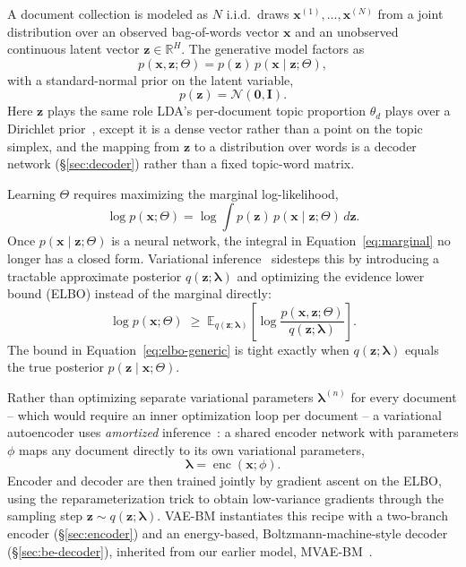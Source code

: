 \documentclass[11pt]{article}
\begin{document}
A document collection is modeled as $N$ i.i.d.\ draws $\mathbf{x}^{(1)},\dots,\mathbf{x}^{(N)}$ from a joint distribution over an observed bag-of-words vector $\mathbf{x}$ and an unobserved continuous latent vector $\mathbf{z}\in\mathbb{R}^H$. The generative model factors as
\begin{equation}
p(\mathbf{x},\mathbf{z};\Theta) = p(\mathbf{z})\,p(\mathbf{x}\mid\mathbf{z};\Theta),
\label{eq:joint}
\end{equation}
with a standard-normal prior on the latent variable,
\begin{equation}
p(\mathbf{z}) = \mathcal{N}(\mathbf{0},\mathbf{I}).
\label{eq:prior}
\end{equation}
Here $\mathbf{z}$ plays the same role LDA's per-document topic proportion $\theta_d$ plays over a Dirichlet prior~\citep{blei2003lda}, except it is a dense vector rather than a point on the topic simplex, and the mapping from $\mathbf{z}$ to a distribution over words is a decoder network (\S\ref{sec:decoder}) rather than a fixed topic-word matrix.

Learning $\Theta$ requires maximizing the marginal log-likelihood,
\begin{equation}
\log p(\mathbf{x};\Theta) = \log\int p(\mathbf{z})\,p(\mathbf{x}\mid\mathbf{z};\Theta)\,d\mathbf{z}.
\label{eq:marginal}
\end{equation}
Once $p(\mathbf{x}\mid\mathbf{z};\Theta)$ is a neural network, the integral in Equation~\ref{eq:marginal} no longer has a closed form. Variational inference~\citep{jordan1999introduction} sidesteps this by introducing a tractable approximate posterior $q(\mathbf{z};\boldsymbol{\lambda})$ and optimizing the evidence lower bound (ELBO) instead of the marginal directly:
\begin{equation}
\log p(\mathbf{x};\Theta) \;\geq\; \mathbb{E}_{q(\mathbf{z};\boldsymbol{\lambda})}\!\left[\log\frac{p(\mathbf{x},\mathbf{z};\Theta)}{q(\mathbf{z};\boldsymbol{\lambda})}\right].
\label{eq:elbo-generic}
\end{equation}
The bound in Equation~\ref{eq:elbo-generic} is tight exactly when $q(\mathbf{z};\boldsymbol{\lambda})$ equals the true posterior $p(\mathbf{z}\mid\mathbf{x};\Theta)$.

Rather than optimizing separate variational parameters $\boldsymbol{\lambda}^{(n)}$ for every document -- which would require an inner optimization loop per document -- a variational autoencoder uses \emph{amortized} inference~\citep{kingma2014autoencoding,rezende2014stochastic}: a shared encoder network with parameters $\phi$ maps any document directly to its own variational parameters,
\begin{equation}
\boldsymbol{\lambda} = \operatorname{enc}(\mathbf{x};\phi).
\label{eq:amortized}
\end{equation}
Encoder and decoder are then trained jointly by gradient ascent on the ELBO, using the reparameterization trick to obtain low-variance gradients through the sampling step $\mathbf{z}\sim q(\mathbf{z};\boldsymbol{\lambda})$. VAE-BM instantiates this recipe with a two-branch encoder (\S\ref{sec:encoder}) and an energy-based, Boltzmann-machine-style decoder (\S\ref{sec:be-decoder}), inherited from our earlier model, MVAE-BM~\citep{gomes2021mvaebm}.
\end{document}
